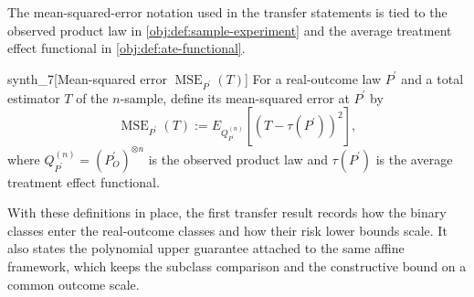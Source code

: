\documentclass[11pt]{article}
\begin{document}
The mean-squared-error notation used in the transfer statements is tied to the observed product law in \cref{obj:def:sample-experiment} and the average treatment effect functional in \cref{obj:def:ate-functional}.

\begin{definitionv}{synth_7}[Mean-squared error \(\operatorname{MSE}_{P^{\prime}}(T)\)]
For a real-outcome law \(P^{\prime}\) and a total estimator \(T\) of the \(n\)-sample, define its mean-squared error at \(P^{\prime}\) by \[\operatorname{MSE}_{P^{\prime}}(T):=E_{Q_{P^{\prime}}^{(n)}}\left[\left(T-\tau(P^{\prime})\right)^2\right],\] where \(Q_{P^{\prime}}^{(n)}=(P_O^{\prime})^{\otimes n}\) is the observed product law and \(\tau(P^{\prime})\) is the average treatment effect functional.
\end{definitionv}

With these definitions in place, the first transfer result records how the binary classes enter the real-outcome classes and how their risk lower bounds scale. It also states the polynomial upper guarantee attached to the same affine framework, which keeps the subclass comparison and the constructive bound on a common outcome scale.
\end{document}
